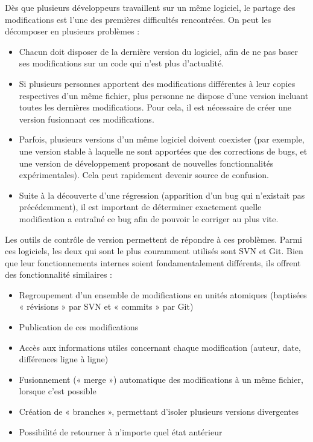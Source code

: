 Dès que plusieurs développeurs travaillent sur un même logiciel, le partage des modifications est l'une des premières difficultés rencontrées. On peut les décomposer en plusieurs problèmes :

\begin{itemize}
\item Chacun doit disposer de la dernière version du logiciel, afin de ne pas baser ses modifications sur un code qui n’est plus d’actualité.
\item Si plusieurs personnes apportent des modifications différentes à leur copies respectives d’un même fichier, plus personne ne dispose d’une version incluant toutes les dernières modifications. Pour cela, il est nécessaire de créer une version fusionnant ces modifications.
\item Parfois, plusieurs versions d’un même logiciel doivent coexister (par exemple, une version stable à laquelle ne sont apportées que des corrections de bugs, et une version de développement proposant de nouvelles fonctionnalités expérimentales). Cela peut rapidement devenir source de confusion.
\item Suite à la découverte d’une régression (apparition d’un bug qui n’existait pas précédemment), il est important de déterminer exactement quelle modification a entraîné ce bug afin de pouvoir le corriger au plus vite.
\end{itemize}

Les outils de contrôle de version permettent de répondre à ces problèmes. Parmi ces logiciels, les deux qui sont le plus couramment utilisés sont SVN et Git. Bien que leur fonctionnements internes soient fondamentalement différents, ils offrent des fonctionnalité similaires :

\begin{itemize}
\item Regroupement d’un ensemble de modifications en unités atomiques (baptisées « révisions » par SVN et « commits » par Git)
\item Publication de ces modifications
\item Accès aux informations utiles concernant chaque modification (auteur, date, différences ligne à ligne)
\item Fusionnement (« merge ») automatique des modifications à un même fichier, lorsque c’est possible
\item Création de « branches », permettant d’isoler plusieurs versions divergentes
\item Possibilité de retourner à n’importe quel état antérieur
\end{itemize}


